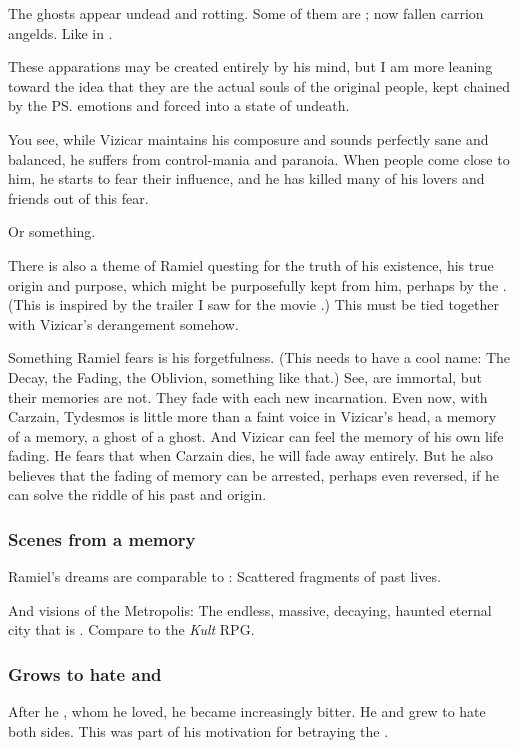 The ghosts appear undead and rotting. 
Some of them are \resphain; now fallen carrion angelds. 
Like in . 

These apparations may be created entirely by his mind, but I am more leaning toward the idea that they are the actual souls of the original people, kept chained by the \ps{\Malach}{} emotions and forced into a state of undeath. 

You see, while Vizicar maintains his composure and sounds perfectly sane and balanced, he suffers from control-mania and paranoia. When people come close to him, he starts to fear their influence, and he has killed many of his lovers and friends out of this fear. 

Or something. 

There is also a theme of Ramiel questing for the truth of his existence, his true origin and purpose, which might be purposefully kept from him, perhaps by the \banes. 
(This is inspired by the trailer I saw for the movie \cite{Movie:BourneUltimatum}.) 
This must be tied together with Vizicar's derangement somehow. 

Something Ramiel fears is his forgetfulness. (This needs to have a cool name: The Decay, the Fading, the Oblivion, something like that.) 
See, \Malachim{} are immortal, but their memories are not. 
They fade with each new incarnation. Even now, with Carzain, Tydesmos is little more than a faint voice in Vizicar's head, a memory of a memory, a ghost of a ghost. And Vizicar can feel the memory of his own life fading. He fears that when Carzain dies, he will fade away entirely. But he also believes that the fading of memory can be arrested, perhaps even reversed, if he can solve the riddle of his past and origin. 





\subsubsection{Scenes from a memory}
Ramiel's dreams are comparable to \cite{DreamTheater:ScenesfromaMemory}: Scattered fragments of past lives. 

And visions of the Metropolis: The endless, massive, decaying, haunted eternal city that is \Nyx. Compare to the \emph{Kult} RPG. 





\subsubsection{Grows to hate \dragons{} and \banes}
After he , whom he loved, he became increasingly bitter. 
He  and grew to hate both sides. 
This was part of his motivation for betraying the \banelords. 





